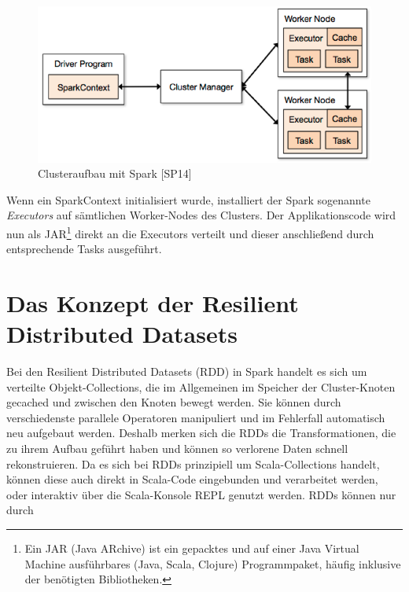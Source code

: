 
\begin{figure}[htb!]
\centering
\includegraphics[width=1.0\textwidth]{bilder/3_2_cluster.png}
\caption{Clusteraufbau mit Spark [SP14]}
\label{fig:sparkcluster}
\end{figure} 





Wenn ein SparkContext initialisiert wurde, installiert der Spark sogenannte \textit{Executors} auf sämtlichen Worker-Nodes des Clusters. Der Applikationscode wird nun als JAR\footnote{Ein JAR (Java ARchive) ist ein gepacktes und auf einer Java Virtual Machine ausführbares (Java, Scala, Clojure) Programmpaket, häufig inklusive der benötigten Bibliotheken.} direkt an die Executors verteilt und dieser anschließend durch entsprechende Tasks ausgeführt. 



  
\section{Das Konzept der Resilient Distributed Datasets}
\label{section:rdd}



Bei den Resilient Distributed Datasets (RDD) in Spark handelt es sich um verteilte Objekt-Collections, die im Allgemeinen im Speicher der Cluster-Knoten gecached  und zwischen den Knoten bewegt werden. Sie können durch verschiedenste parallele Operatoren manipuliert und im Fehlerfall automatisch neu aufgebaut werden. Deshalb merken sich die RDDs die Transformationen, die zu ihrem Aufbau geführt haben und können so verlorene Daten schnell rekonstruieren. Da es sich bei RDDs prinzipiell um Scala-Collections handelt, können diese auch direkt in Scala-Code eingebunden und verarbeitet werden, oder interaktiv über die Scala-Konsole REPL genutzt werden. RDDs können nur durch 




